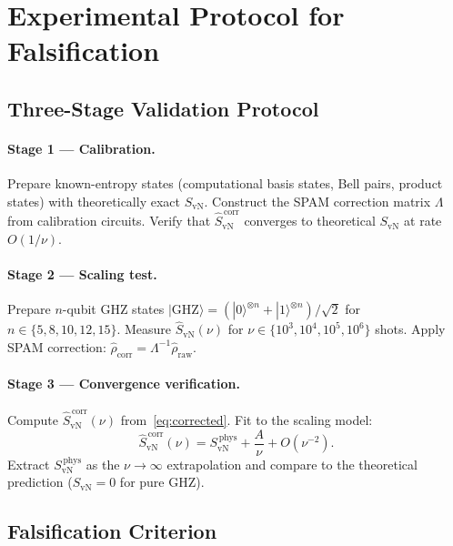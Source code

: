 \documentclass[12pt,letterpaper]{article}
\theoremstyle{plain}
\theoremstyle{definition}
\newcommand{\SvN}{S_{\mathrm{vN}}}
\newcommand{\hSvN}{\hat{S}_{\mathrm{vN}}}
\begin{document}
\section{Experimental Protocol for Falsification}
\label{sec:experiment}

\subsection{Three-Stage Validation Protocol}

\paragraph{Stage 1 --- Calibration.}
Prepare known-entropy states (computational basis states, Bell pairs, product states) with
theoretically exact $\SvN$.  Construct the SPAM correction matrix $\Lambda$ from calibration
circuits.  Verify that $\hSvN^{\,\mathrm{corr}}$ converges to theoretical $\SvN$ at rate
$O(1/\nu)$.

\paragraph{Stage 2 --- Scaling test.}
Prepare $n$-qubit GHZ states
$|\mathrm{GHZ}\rangle = (|0\rangle^{\otimes n} + |1\rangle^{\otimes n})/\!\sqrt{2}$
for $n \in \{5, 8, 10, 12, 15\}$.  Measure
$\hSvN(\nu)$ for $\nu \in \{10^{3}, 10^{4}, 10^{5}, 10^{6}\}$ shots.
Apply SPAM correction: $\hat{\rho}_{\mathrm{corr}} = \Lambda^{-1}\hat{\rho}_{\mathrm{raw}}$.

\paragraph{Stage 3 --- Convergence verification.}
Compute $\hSvN^{\,\mathrm{corr}}(\nu)$ from~\eqref{eq:corrected}.  Fit to the scaling model:
\begin{equation}
  \hSvN^{\,\mathrm{corr}}(\nu)
  = \SvN^{\,\mathrm{phys}}
  + \frac{A}{\nu}
  + O\!\left(\nu^{-2}\right).
  \label{eq:scaling-model}
\end{equation}
Extract $\SvN^{\,\mathrm{phys}}$ as the $\nu \to \infty$ extrapolation and compare to the
theoretical prediction ($\SvN = 0$ for pure GHZ).

\subsection{Falsification Criterion}
\end{document}
